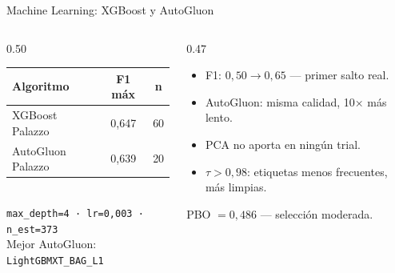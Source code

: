 \documentclass[aspectratio=169, spanish, 12pt]{beamer}
\begin{document}
\begin{frame}{Machine Learning: XGBoost y AutoGluon}
  \begin{columns}[T]
    \begin{column}{0.50\textwidth}
      \begin{tcolorbox}[familybox=colml]
        \begin{tabular}{lcc}
          \toprule
          \textbf{Algoritmo} & \textbf{F1 máx} & \textbf{n} \\
          \midrule
          XGBoost Palazzo   & 0,647 & 60 \\
          AutoGluon Palazzo & 0,639 & 20 \\
          \bottomrule
        \end{tabular}
        \vspace{0.2em}\\
        \small\texttt{max\_depth=4 · lr=0,003 · n\_est=373}\\
        Mejor AutoGluon: \texttt{LightGBMXT\_BAG\_L1}
      \end{tcolorbox}
    \end{column}
    \begin{column}{0.47\textwidth}
      \begin{itemize}
        \item[\faArrowUp] F1: $0{,}50 \to 0{,}65$ — primer salto real.
        \item[\faHourglass] AutoGluon: misma calidad, 10× más lento.
        \item[\faMinusCircle] PCA no aporta en ningún trial.
        \item[\faCheckCircle] $\tau{>}0{,}98$: etiquetas menos frecuentes, más limpias.
      \end{itemize}
      \vspace{0.3em}
      \begin{tcolorbox}[familybox=colml]
        \small PBO $= 0{,}486$ — selección moderada.
      \end{tcolorbox}
    \end{column}
  \end{columns}
\end{frame}
\end{document}
